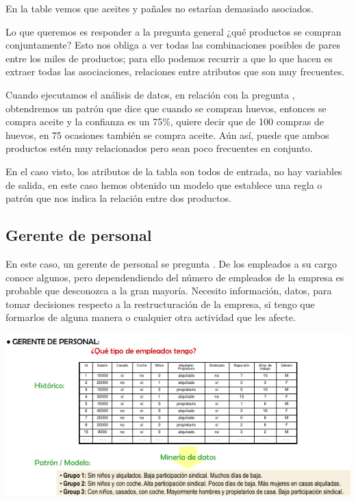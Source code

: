 En la table vemos que aceites y pañales no estarían demasiado asociados.

Lo que queremos es responder a la pregunta general ¿qué productos se compran conjuntamente? Esto nos obliga a ver todas las combinaciones posibles de pares entre los miles de productos; para ello podemos recurrir a  que lo que hacen es extraer todas las asociaciones, relaciones entre atributos que son muy frecuentes.

Cuando ejecutamos el análisis de datos, en relación con la pregunta , obtendremos un patrón que dice que cuando se compran huevos, entonces se compra aceite y la confianza es un 75\%, quiere decir que de 100 compras de huevos, en 75 ocasiones también se compra aceite. Aún así, puede que ambos productos estén muy relacionados pero sean poco frecuentes en conjunto.

En el caso visto, los atributos de la tabla son todos de entrada, no hay variables de salida, en este caso hemos obtenido un modelo que establece una regla o patrón que nos indica la relación entre dos productos.

\subsection{Gerente de personal}


En este caso, un gerente de personal se pregunta . De los empleados a su cargo conoce algunos, pero dependendiendo del número de empleados de la empresa es probable que desconozca a la gran mayoría. Necesito información, datos, para tomar decisiones respecto a la restructuración de la empresa, si tengo que formarlos de alguna manera o cualquier otra actividad que les afecte.

\begin{center}
    \includegraphics[scale=.8]{images/mod01-05.png}
\end{center}

